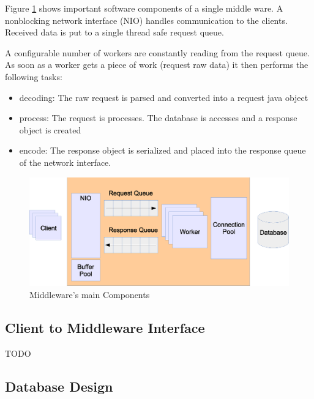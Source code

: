 \documentclass[a4paper]{article}
\begin{document}
Figure \ref{fig:middleware-threading} shows important software components of a single middle ware. A nonblocking network interface (NIO) handles communication to the clients. Received data is put to a single thread safe request queue.

A configurable number of workers are constantly reading from the request queue. As soon as a worker gets a piece of work (request raw data) it then performs the following tasks:
\begin{itemize}
\item decoding: The raw request is parsed and converted into a request java object
\item process: The request is processes. The database is accesses and a response object is created
\item encode: The response object is serialized and placed into the response queue of the network interface.
\end{itemize}


\begin{figure}
	\begin{center}
    \includegraphics[scale=0.4]{../drawings/broker-threading.eps}
  \end{center}
  \caption{Middleware's main Components}
  \label{fig:middleware-threading}
\end{figure}

\subsection{Client to Middleware Interface}

TODO


\subsection{Database Design}
\end{document}
